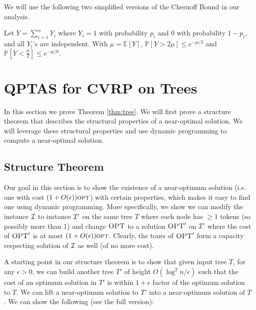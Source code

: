 \documentclass[twoside,leqno]{article}
\newcommand{\calI}{{\cal I}}
\newcommand{\Prob}[1]{\mathbb{P}{\left[#1\right]}}
\newcommand{\Ex}[1]{\mathbb{E}{\left[#1\right]}}
\newcommand{\opt}{\mbox{\sc opt}}
\newcommand{\OPT}{\mbox{\sc OPT}}
\newcommand{\eps}{\epsilon}
\begin{document}
We will use the following two simplified versions of the Chernoff Bound \cite{Mitzenmacher} in our analysis.
\begin{lemma}
Let $Y = \sum_{i = 1}^n Y_i$ where $Y_i = 1$ with probability $p_i$ and 0 with probability $1- p_i$, and all $Y_i$'s are independent. With $\mu = \Ex{Y}$,  $\Prob{Y > 2\mu} \le e^{-\mu/3}$
and $\Prob{Y < \frac{\mu}{2}} \le e^{-\mu/8}.$
\end{lemma}

\section{QPTAS for CVRP on Trees}
In this section we prove Theorem \ref{thm:tree}.
We will first prove a structure theorem that describes the structural properties of a near-optimal solution. We will leverage these structural properties and use dynamic programming to compute a near-optimal solution.

\subsection{Structure Theorem}

Our goal in this section is to show the existence of a near-optimum solution (i.e. one with cost $(1 + O(\eps))\opt$) with
certain properties, which makes it easy to find one using dynamic programming.
More specifically, we show we can modify the instance $\calI$ to instance $\calI'$ on the same tree $T$ where each node has $\geq 1$
tokens (so possibly more than 1) and change $\OPT$ to a solution $\OPT'$ on $\calI'$ where the cost of $\OPT'$ is at most
$(1+O(\eps))\opt$. Clearly, the tours of $\OPT'$ form a capacity respecting solution of $\calI$ as well (of no more cost).

A starting point in our structure theorem is to show that given input tree $T$, for any $\epsilon>0$, we can build another tree $T'$ of height $O(\log^2 n/\epsilon)$ such that the cost of an
optimum solution in $T'$ is within $1+\epsilon$ factor of the optimum solution to $T$. We can lift a near-optimum solution to $T'$ into a near-optimum solution of $T$.
We can show the following (see the full version):
\end{document}
